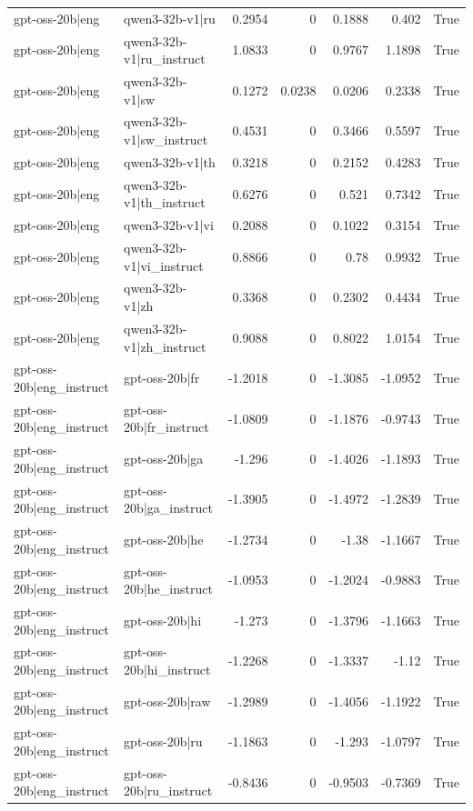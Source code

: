 \begin{table}
\begin{tabular}{l l r r r r l}
gpt-oss-20b|eng & qwen3-32b-v1|ru & 0.2954 & 0 & 0.1888 & 0.402 & True \\
gpt-oss-20b|eng & qwen3-32b-v1|ru_instruct & 1.0833 & 0 & 0.9767 & 1.1898 & True \\
gpt-oss-20b|eng & qwen3-32b-v1|sw & 0.1272 & 0.0238 & 0.0206 & 0.2338 & True \\
gpt-oss-20b|eng & qwen3-32b-v1|sw_instruct & 0.4531 & 0 & 0.3466 & 0.5597 & True \\
gpt-oss-20b|eng & qwen3-32b-v1|th & 0.3218 & 0 & 0.2152 & 0.4283 & True \\
gpt-oss-20b|eng & qwen3-32b-v1|th_instruct & 0.6276 & 0 & 0.521 & 0.7342 & True \\
gpt-oss-20b|eng & qwen3-32b-v1|vi & 0.2088 & 0 & 0.1022 & 0.3154 & True \\
gpt-oss-20b|eng & qwen3-32b-v1|vi_instruct & 0.8866 & 0 & 0.78 & 0.9932 & True \\
gpt-oss-20b|eng & qwen3-32b-v1|zh & 0.3368 & 0 & 0.2302 & 0.4434 & True \\
gpt-oss-20b|eng & qwen3-32b-v1|zh_instruct & 0.9088 & 0 & 0.8022 & 1.0154 & True \\
gpt-oss-20b|eng_instruct & gpt-oss-20b|fr & -1.2018 & 0 & -1.3085 & -1.0952 & True \\
gpt-oss-20b|eng_instruct & gpt-oss-20b|fr_instruct & -1.0809 & 0 & -1.1876 & -0.9743 & True \\
gpt-oss-20b|eng_instruct & gpt-oss-20b|ga & -1.296 & 0 & -1.4026 & -1.1893 & True \\
gpt-oss-20b|eng_instruct & gpt-oss-20b|ga_instruct & -1.3905 & 0 & -1.4972 & -1.2839 & True \\
gpt-oss-20b|eng_instruct & gpt-oss-20b|he & -1.2734 & 0 & -1.38 & -1.1667 & True \\
gpt-oss-20b|eng_instruct & gpt-oss-20b|he_instruct & -1.0953 & 0 & -1.2024 & -0.9883 & True \\
gpt-oss-20b|eng_instruct & gpt-oss-20b|hi & -1.273 & 0 & -1.3796 & -1.1663 & True \\
gpt-oss-20b|eng_instruct & gpt-oss-20b|hi_instruct & -1.2268 & 0 & -1.3337 & -1.12 & True \\
gpt-oss-20b|eng_instruct & gpt-oss-20b|raw & -1.2989 & 0 & -1.4056 & -1.1922 & True \\
gpt-oss-20b|eng_instruct & gpt-oss-20b|ru & -1.1863 & 0 & -1.293 & -1.0797 & True \\
gpt-oss-20b|eng_instruct & gpt-oss-20b|ru_instruct & -0.8436 & 0 & -0.9503 & -0.7369 & True \\

\end{tabular}
\end{table}
